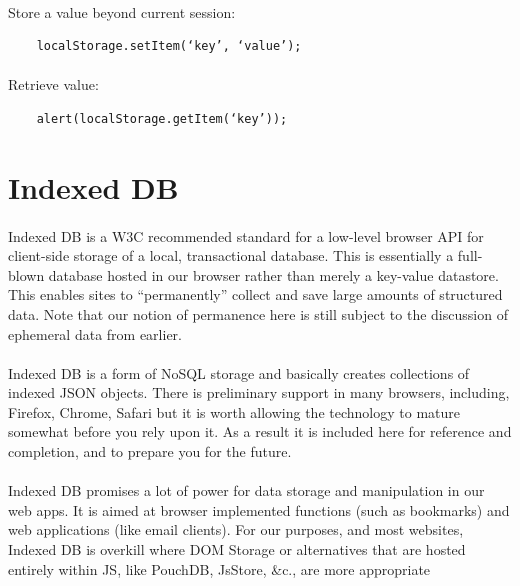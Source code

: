 \paragraph{} Store a value beyond current session:

\begin{lstlisting}
	localStorage.setItem(‘key’, ‘value’);
\end{lstlisting}

\paragraph{} Retrieve value:

\begin{lstlisting}
	alert(localStorage.getItem(‘key’));
\end{lstlisting}



\section{Indexed DB}
\paragraph{} Indexed DB is a W3C recommended standard for a low-level browser API for client-side storage of a local, transactional database. This is essentially a full-blown database hosted in our browser rather than merely a key-value datastore. This enables sites to “permanently” collect and save large amounts of structured data. Note that our notion of permanence here is still subject to the discussion of ephemeral data from earlier.
\paragraph{} Indexed DB is a form of NoSQL storage and basically creates collections of indexed  JSON objects. There is preliminary support in many browsers, including, Firefox, Chrome, Safari but it is worth allowing the technology to mature somewhat before you rely upon it. As a result it is included here for reference and completion, and to prepare you for the future.
\paragraph{} Indexed DB promises a lot of power for data storage and manipulation in our web apps. It is aimed at browser implemented functions (such as bookmarks) and web applications (like email clients). For our purposes, and most websites, Indexed DB is overkill where DOM Storage or alternatives that are hosted entirely within JS, like PouchDB, JsStore, \&c., are more appropriate


